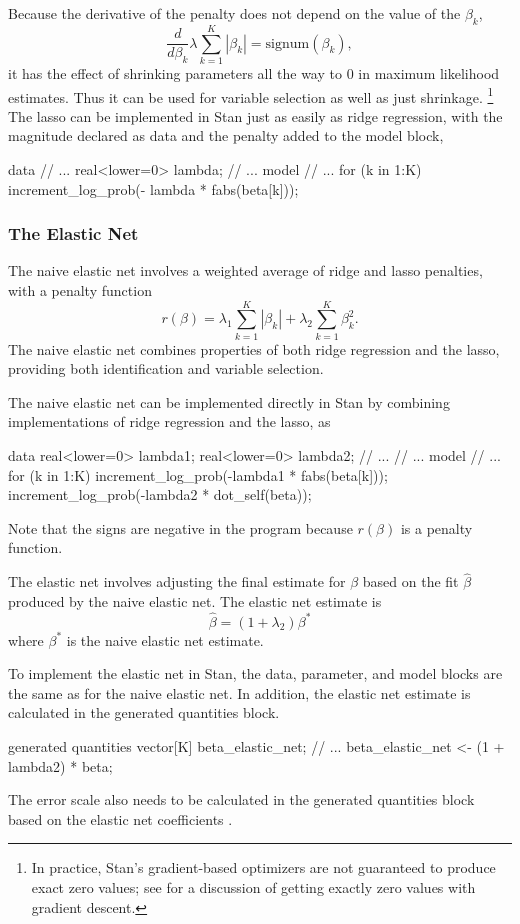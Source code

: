Because the derivative of the penalty does not depend on the value of
the $\beta_k$,
\[
\frac{d}{d\beta_k} \lambda \sum_{k=1}^K | \beta_k | =
\mbox{signum}(\beta_k),
\]
it has the effect of shrinking parameters all the way to 0 in maximum
likelihood estimates.  Thus it can be used for variable selection as
well as just shrinkage.%
%
\footnote{In practice, Stan's gradient-based optimizers are not
  guaranteed to produce exact zero values; see
  \cite{LangfordEtAl:2009} for a discussion of getting exactly zero
  values with gradient descent.}
%
The lasso can be implemented in Stan just as easily as ridge
regression, with the magnitude declared as data and the penalty added
to the model block,
%
\begin{stancode}
data {
  // ...
  real<lower=0> lambda;
}
// ...
model {
  // ...
  for (k in 1:K)
    increment_log_prob(- lambda * fabs(beta[k]));
}
\end{stancode}

\subsubsection{The Elastic Net}

The naive elastic net \citep{ZouHastie:2005} involves a weighted
average of ridge and lasso penalties, with a penalty function
\[
r(\beta)
= \lambda_1 \sum_{k=1}^K |\beta_k|
+ \lambda_2 \sum_{k=1}^K \beta_k^2.
\]
The naive elastic net combines properties of both ridge regression and
the lasso, providing both identification and variable selection.

The naive elastic net can be implemented directly in Stan by combining
implementations of ridge regression and the lasso, as
%
\begin{stancode}
data {
  real<lower=0> lambda1;
  real<lower=0> lambda2;
  // ...
}
// ...
model {
  // ...
  for (k in 1:K)
    increment_log_prob(-lambda1 * fabs(beta[k]));
  increment_log_prob(-lambda2 * dot_self(beta));
}
\end{stancode}
%
Note that the signs are negative in the program because $r(\beta)$ is
a penalty function.

The elastic net \citep{ZouHastie:2005} involves adjusting the final estimate for
$\beta$ based on the fit $\hat{\beta}$ produced by the naive elastic
net.  The elastic net estimate is
\[
\hat{\beta} = (1 + \lambda_2) \beta^*
\]
where $\beta^{*}$ is the naive elastic net estimate.

To implement the elastic net in Stan, the data, parameter, and model
blocks are the same as for the naive elastic net.  In addition, the
elastic net estimate is calculated in the generated quantities block.
%
\begin{stancode}
generated quantities {
  vector[K] beta_elastic_net;
  // ...
  beta_elastic_net <- (1 + lambda2) * beta;
}
\end{stancode}
%
The error scale also needs to be calculated in the generated
quantities block based on the elastic net coefficients
.



